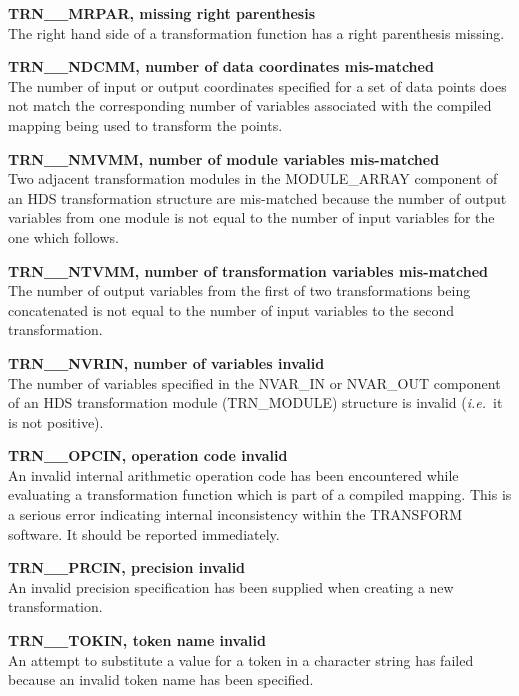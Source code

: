\documentclass[twoside,nolof,11pt]{starlink}
\providecommand{\name}[1]{\small{#1}}
\begin{document}
\begin{description}
\item \textbf{TRN\_\_MRPAR, missing right parenthesis}\\
The right hand side of a transformation function has a right parenthesis
missing.

\item \textbf{TRN\_\_NDCMM, number of data coordinates mis-matched}\\
The number of input or output coordinates specified for a set of data points
does not match the corresponding number of variables associated with the
compiled mapping being used to transform the points.

\item \textbf{TRN\_\_NMVMM, number of module variables mis-matched}\\
Two adjacent transformation modules in the \name{MODULE\_ARRAY} component of
an \name{HDS} transformation structure are mis-matched because the number of
output variables from one module is not equal to the number of input
variables for the one which follows.

\item \textbf{TRN\_\_NTVMM, number of transformation variables mis-matched}\\
The number of output variables from the first of two transformations being
concatenated is not equal to the number of input variables to the second
transformation.

\item \textbf{TRN\_\_NVRIN, number of variables invalid}\\
The number of variables specified in the \name{NVAR\_IN} or \name{NVAR\_OUT}
component of an \name{HDS} transformation module (\name{TRN\_MODULE})
structure is invalid (\emph{i.e.}\ it is not positive).

\item \textbf{TRN\_\_OPCIN, operation code invalid}\\
An invalid internal arithmetic operation code has been encountered while
evaluating a transformation function which is part of a compiled mapping.
This is a serious error indicating internal inconsistency within the
\name{TRANSFORM} software.
It should be reported immediately.

\item \textbf{TRN\_\_PRCIN, precision invalid}\\
An invalid precision specification has been supplied when creating a new
transformation.

\item \textbf{TRN\_\_TOKIN, token name invalid}\\
An attempt to substitute a value for a token in a character string has failed
because an invalid token name has been specified.


\end{description}
\end{document}

